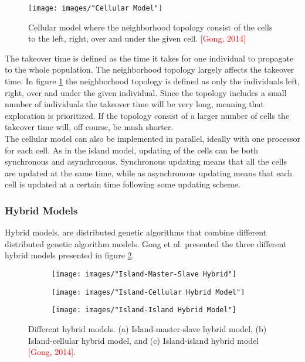 \begin{figure}[h!]
\begin{center}
\texttt{[image: images/"Cellular Model"]}
\caption{Cellular model where the neighborhood topology consist of the cells to the left, right, over and under the given cell. \textcolor{red}{[Gong, 2014]}}
\label{Cellular model}
\end{center}
\end{figure}


\noindent The takeover time is defined as the time it takes for one individual to propagate to the whole population. The neighborhood topology largely affects the takeover time. In figure \ref{Cellular model} the neighborhood topology is defined as only the individuals left, right, over and under the given individual. Since the topology includes a small number of individuals the takeover time will be very long, meaning that exploration is prioritized. If the topology consist of a larger number of cells the takeover time will, off course, be mush shorter.\\


\noindent The cellular model can also be implemented in parallel, ideally with one processor for each cell. As in the island model, updating of the cells can be both synchronous and asynchronous. Synchronous updating means that all the cells are updated at the same time, while as asynchronous updating means that each cell is updated at a certain time following some updating scheme. 


\subsubsection{Hybrid Models}
Hybrid models, are distributed genetic algorithms that combine different distributed genetic algorithm models. Gong et al. presented the three different hybrid models presented in figure \ref{Hybrid Models}.\\


\begin{figure}[h!]
    \centering
    \begin{subfigure}[b]{0.3\textwidth}
        \texttt{[image: images/"Island-Master-Slave Hybrid"]}
        \caption{}
    \end{subfigure}
    \begin{subfigure}[b]{0.3\textwidth}
        \texttt{[image: images/"Island-Cellular Hybrid Model"]}
        \caption{}
    \end{subfigure}
    \begin{subfigure}[b]{0.3\textwidth}
        \texttt{[image: images/"Island-Island Hybrid Model"]}
        \caption{}
    \end{subfigure}
    \caption{Different hybrid models. (a) Island-master-slave hybrid model, (b) Island-cellular hybrid model, and (c) Island-island hybrid model \textcolor{red}{[Gong, 2014]}.}
    \label{Hybrid Models}
\end{figure}


